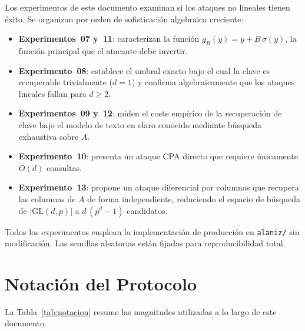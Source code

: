 \documentclass[12pt,a4paper]{article}
\theoremstyle{definition}
\newcommand{\GL}{\mathrm{GL}}
\begin{document}
Los experimentos de este documento examinan si los ataques no lineales
tienen éxito. Se organizan por orden de sofisticación algebraica
creciente:

\begin{itemize}
  \item \textbf{Experimentos~07 y~11}: caracterizan la función
    $g_B(y) = y + B\,\sigma(y)$, la función principal que el atacante
    debe invertir.
  \item \textbf{Experimento~08}: establece el umbral exacto bajo el
    cual la clave es recuperable trivialmente ($d = 1$) y confirma
    algebraicamente que los ataques lineales fallan para $d \geq 2$.
  \item \textbf{Experimentos~09 y~12}: miden el coste empírico de la
    recuperación de clave bajo el modelo de texto en claro conocido
    mediante búsqueda exhaustiva sobre $A$.
  \item \textbf{Experimento~10}: presenta un ataque CPA directo que
    requiere únicamente $O(d)$ consultas.
  \item \textbf{Experimento~13}: propone un ataque diferencial por
    columnas que recupera las columnas de $A$ de forma independiente,
    reduciendo el espacio de búsqueda de $|\GL(d,p)|$ a
    $d\,(p^d - 1)$ candidatos.
\end{itemize}

Todos los experimentos emplean la implementación de producción en
\texttt{alaniz/} sin modificación. Las semillas aleatorias están
fijadas para reproducibilidad total.

\section{Notación del Protocolo}

La Tabla~\ref{tab:notacion} resume las magnitudes utilizadas a lo
largo de este documento.
\end{document}
